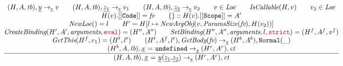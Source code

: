 \documentclass[a4paper, leqno]{amsart}
\newcommand{\rulesep}{\quad\quad}
\newcommand{\stmt}{s}
\newcommand{\expr}{e}
\newcommand{\ir}[1]{\ensuremath{\underline{#1}}}
\newcommand{\irid}{\ir{x}}
\def\inred{\color{red}}
\newcommand{\strict}{{\inred\tt strict}}
\newcommand{\eval}{{\inred\tt eval}}
\newcommand{\undef}{{\tt undefined}}
\newcommand{\tb}{\emph{tb}}
\newcommand{\Loc}{\emph{Loc}}
\newcommand{\ct}{\emph{ct}}
\newcommand{\hf}[1]{\emph{#1}}
\newcommand{\state}{\ensuremath{(H,A,\tb)}}
\newcommand{\respp}{\ensuremath{(H'',A'')}}
\newcommand{\evale}{\ensuremath{(H,A,\tb)}}
\newcommand{\ircall}{\ensuremath{\irid \ {\tt =} \ \ir{y}{\tt(}\ir{z_1}{\tt,}\ir{z_2}{\tt)}}}
\def\inred{\color{red}}
\begin{document}
\[\begin{array}{l@{~~}l@{~~}ll}
\frac{\begin{matrix}
\evale, \ir{y} \rightarrow_{\ir\expr} v
\rulesep
\evale, \ir{z_1} \rightarrow_{\ir\expr} v_1
\rulesep
\evale, \ir{z_2} \rightarrow_{\ir\expr} v_2
\rulesep
v \in \Loc
\rulesep
\hf{IsCallable}(H,v)
\rulesep
v_2 \in \Loc
\\
H(v).{\tt[[Code]]} = \emph{fv}
\rulesep
\{\}::H(v).{\tt[[Scope]]} = A'
\\
\hf{NewLoc}() = l
\rulesep
H' = H[l\mapsto \hf{NewArgObj}(v, \hf{ParamsSize}(\emph{fv}), H(v_2))]
\\
\hf{CreateBinding}(H', A', \hf{arguments}, \eval) = \respp%
\rulesep
\hf{SetBinding}(H'', A'', \hf{arguments}, l, \strict) = (H^f, A^f, v^f)%
\\
\hf{GetThis}(H^f,v_1) = (H^t,l^t)
\rulesep
(H^t, A^f, l^t), \hf{GetBody}(\emph{fv}) \rightarrow_{\ir\stmt} (H^b, A^b), {\tt Normal}(\_)
\\
(H^b, A, \tb), \irid\ {\tt =} \ \undef \rightarrow_{\ir\stmt} (H^r,A^r), \ct
\end{matrix}}{\begin{matrix}
\state, \ircall \rightarrow_{\ir\stmt}
(H^r,A^r), \ct
\end{matrix}}
\\[2em]
\end{array}
\]
\end{document}

